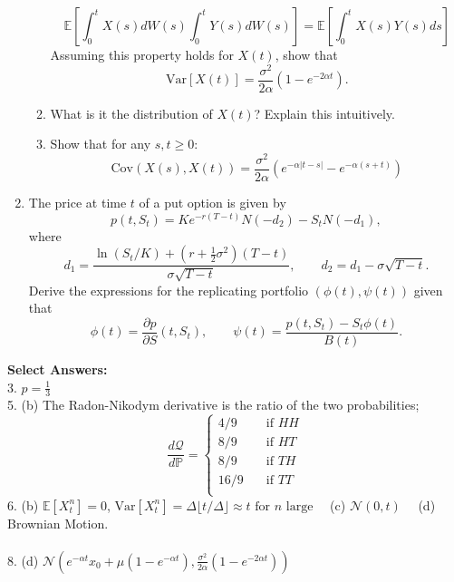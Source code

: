 \documentclass[11pt]{article}
\newcommand{\E}{\mathbb{E}}
\newcommand{\PR}{\mathbb{P}}
\begin{document}
\begin{enumerate}
\begin{enumerate}
			\[	\E\left[\int_{0}^{t}X(s)dW(s)\int_{0}^{t}Y(s)dW(s)\right]
			= \E\left[\int_{0}^{t}X(s)Y(s)ds\right]
			\]
			Assuming this property holds for $X(t)$, show that
			\[	\text{Var}[X(t)] = \frac{\sigma^{2}}{2\alpha}(1 - e^{-2\alpha t}).
			\]
			\item What is it the distribution of $X(t)$? Explain this intuitively.
			\item Show that for any $s, t\geq 0$:
			\[	\text{Cov}(X(s), X(t)) = \frac{\sigma^{2}}{2\alpha}(e^{-\alpha|t - s|} - e^{-\alpha(s + t)})
			\]
		\end{enumerate}
		\item The price at time $t$ of a put option is given by 
		\[		p(t, S_t) = Ke^{-r(T - t)}N(-d_{2}) - S_t N(-d_1),
		\]
		where
		\[		d_{1} = \frac{\ln(S_t/ K) + (r + \frac{1}{2}\sigma^2)(T -t)}{\sigma \sqrt{T - t}},\qquad d_{2} = d_{1} - \sigma \sqrt{T - t}.
		\]
		Derive the expressions for the replicating portfolio $(\phi(t), \psi(t))$ given that
		\[		\phi(t) = \frac{\partial p}{\partial S}(t, S_t),\qquad \psi(t)=\frac{p(t, S_t) - S_t \phi(t)}{B(t)}.
		\]
	\end{enumerate}
	\textbf{Select Answers:}\\
	3. \( p=\frac{1}{3} \) \\[1em]
	5. (b) The Radon-Nikodym derivative is the ratio of the two probabilities;
	\[	\frac{d\mathcal{Q}}{d\PR} = \begin{cases}
		4/9 & \quad \text{if }HH\\
		8/9 & \quad \text{if }HT\\
		8/9 & \quad \text{if }TH\\
		16/9 & \quad \text{if }TT\\
	\end{cases}
	\] 
	6. (b) $\mathbb{E}[X^{n}_{t}] = 0$, $\text{Var}[X^{n}_{t}] = \Delta \lfloor t/ \Delta\rfloor\approx t \text{ for $n$ large}\quad$ (c) $\mathcal{N}(0,t)\quad$ (d) Brownian Motion.\\\\
	8. (d) $\mathcal{N}\left(e^{-\alpha t}x_{0} + \mu(1 - e^{-\alpha t}), \frac{\sigma^{2}}{2\alpha}(1 - e^{-2\alpha t})\right)$
\end{document}
